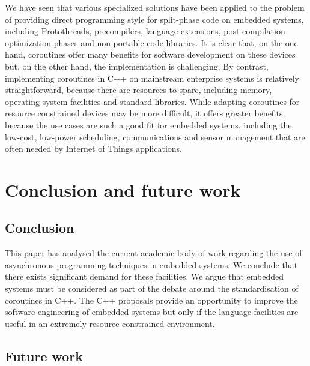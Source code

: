 \documentclass[format=acmsmall, review=false, screen=false]{acmart}
\begin{document}
We have seen that various specialized solutions have been applied to the problem of providing direct programming style for split-phase code on embedded systems, including Protothreads, precompilers, language extensions, post-compilation optimization phases and non-portable code libraries. It is clear that, on the one hand, coroutines offer many benefits for software development on these devices but, on the other hand, the implementation is challenging. By contrast, implementing coroutines in C++ on mainstream enterprise systems is relatively straightforward, because there are resources to spare, including memory, operating system facilities and standard libraries. While adapting coroutines for resource constrained devices may be more difficult, it offers greater benefits, because the use cases are such a good fit for embedded systems, including the low-cost, low-power scheduling, communications and sensor management that are often needed by Internet of Things applications.

\section{Conclusion and future work}
\label{section:conclusion}

\subsection{Conclusion}

This paper has analysed the current academic body of work regarding the use of asynchronous programming techniques in embedded systems. We conclude that there exists significant demand for these facilities. We argue that embedded systems must be considered as part of the debate around the standardisation of coroutines in C++. The C++ proposals provide an opportunity to improve the software engineering of embedded systems but only if the language facilities are useful in an extremely resource-constrained environment.

\subsection{Future work}
\end{document}
